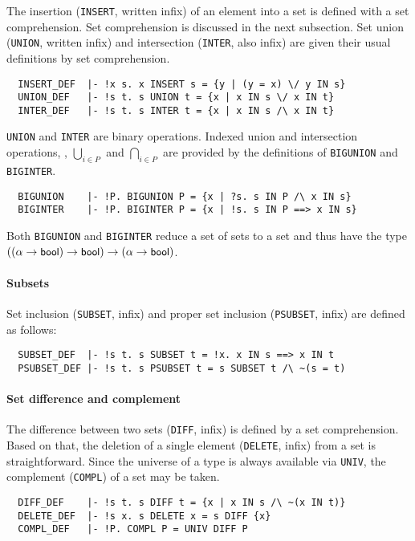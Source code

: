 The insertion ({\small\verb+INSERT+}, written infix) of an element
into a set is defined with a set comprehension. Set comprehension is
discussed in the next subsection. Set union ({\small\verb+UNION+},
written infix) and intersection ({\small\verb+INTER+}, also infix)
are given their usual definitions by set comprehension.
%
{\small
\begin{verbatim}
  INSERT_DEF  |- !x s. x INSERT s = {y | (y = x) \/ y IN s}
  UNION_DEF   |- !s t. s UNION t = {x | x IN s \/ x IN t}
  INTER_DEF   |- !s t. s INTER t = {x | x IN s /\ x IN t}
\end{verbatim}}
%
{\small\verb+UNION+} and {\small\verb+INTER+} are binary
operations. Indexed union and intersection operations, \ie,
$\bigcup_{i \in P}$ and $\bigcap_{i \in P}$ are provided by the
definitions of  {\small\verb+BIGUNION+} and {\small\verb+BIGINTER+}.
{\small
\begin{verbatim}
  BIGUNION    |- !P. BIGUNION P = {x | ?s. s IN P /\ x IN s}
  BIGINTER    |- !P. BIGINTER P = {x | !s. s IN P ==> x IN s}
\end{verbatim}}
%
Both {\small\verb+BIGUNION+} and {\small\verb+BIGINTER+} reduce
a set of sets to a set and thus have the type
$((\alpha\to\mbox{\small{\textbf{\sf{bool}}}})\to\mbox{\small{\textbf{\sf{bool}}}})\to (\alpha\to\mbox{\small{\textbf{\sf{bool}}}})$.

\paragraph{Subsets}

Set inclusion ({\small\verb+SUBSET+}, infix) and proper set inclusion
({\small\verb+PSUBSET+}, infix) are defined as follows:
%
{\small
\begin{verbatim}
  SUBSET_DEF  |- !s t. s SUBSET t = !x. x IN s ==> x IN t
  PSUBSET_DEF |- !s t. s PSUBSET t = s SUBSET t /\ ~(s = t)
\end{verbatim}}

\paragraph{Set difference and complement}

The difference between two sets ({\small\verb+DIFF+}, infix) is
defined by a set comprehension. Based on that, the deletion of a
single element ({\small\verb+DELETE+}, infix) from a set is
straightforward. Since the universe of a type is always available via
{\small\verb+UNIV+}, the complement ({\small\verb+COMPL+}) of a set
may be taken.
{\small
\begin{verbatim}
  DIFF_DEF    |- !s t. s DIFF t = {x | x IN s /\ ~(x IN t)}
  DELETE_DEF  |- !s x. s DELETE x = s DIFF {x}
  COMPL_DEF   |- !P. COMPL P = UNIV DIFF P
\end{verbatim}}
%
